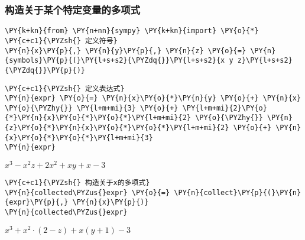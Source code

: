     \hypertarget{ux6784ux9020ux5173ux4e8eux67d0ux4e2aux7279ux5b9aux53d8ux91cfux7684ux591aux9879ux5f0f}{%
\subsubsection{构造关于某个特定变量的多项式}\label{ux6784ux9020ux5173ux4e8eux67d0ux4e2aux7279ux5b9aux53d8ux91cfux7684ux591aux9879ux5f0f}}

    \begin{tcolorbox}[breakable, size=fbox, boxrule=1pt, pad at break*=1mm,colback=cellbackground, colframe=cellborder]
\begin{Verbatim}[commandchars=\\\{\}]
\PY{k+kn}{from} \PY{n+nn}{sympy} \PY{k+kn}{import} \PY{o}{*}
\PY{c+c1}{\PYZsh{} 定义符号}
\PY{n}{x}\PY{p}{,} \PY{n}{y}\PY{p}{,} \PY{n}{z} \PY{o}{=} \PY{n}{symbols}\PY{p}{(}\PY{l+s+s2}{\PYZdq{}}\PY{l+s+s2}{x y z}\PY{l+s+s2}{\PYZdq{}}\PY{p}{)}
\end{Verbatim}
\end{tcolorbox}

    \begin{tcolorbox}[breakable, size=fbox, boxrule=1pt, pad at break*=1mm,colback=cellbackground, colframe=cellborder]
\begin{Verbatim}[commandchars=\\\{\}]
\PY{c+c1}{\PYZsh{} 定义表达式}
\PY{n}{expr} \PY{o}{=} \PY{n}{x}\PY{o}{*}\PY{n}{y} \PY{o}{+} \PY{n}{x} \PY{o}{\PYZhy{}} \PY{l+m+mi}{3} \PY{o}{+} \PY{l+m+mi}{2}\PY{o}{*}\PY{n}{x}\PY{o}{*}\PY{o}{*}\PY{l+m+mi}{2} \PY{o}{\PYZhy{}} \PY{n}{z}\PY{o}{*}\PY{n}{x}\PY{o}{*}\PY{o}{*}\PY{l+m+mi}{2} \PY{o}{+} \PY{n}{x}\PY{o}{*}\PY{o}{*}\PY{l+m+mi}{3}
\PY{n}{expr}
\end{Verbatim}
\end{tcolorbox}
 
            
    
    $\displaystyle x^{3} - x^{2} z + 2 x^{2} + x y + x - 3$

    

    \begin{tcolorbox}[breakable, size=fbox, boxrule=1pt, pad at break*=1mm,colback=cellbackground, colframe=cellborder]
\begin{Verbatim}[commandchars=\\\{\}]
\PY{c+c1}{\PYZsh{} 构造关于x的多项式}
\PY{n}{collected\PYZus{}expr} \PY{o}{=} \PY{n}{collect}\PY{p}{(}\PY{n}{expr}\PY{p}{,} \PY{n}{x}\PY{p}{)}
\PY{n}{collected\PYZus{}expr}
\end{Verbatim}
\end{tcolorbox}
 
            
    
    $\displaystyle x^{3} + x^{2} \cdot \left(2 - z\right) + x \left(y + 1\right) - 3$
